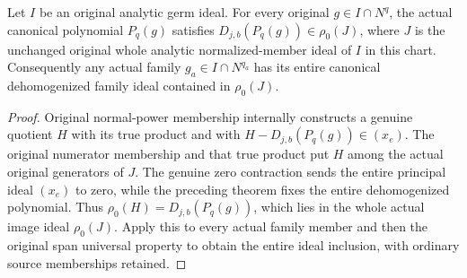 \begin{theorem}
\label{hir:actual-normal-components-in-axis-normalized-image}
Let $I$ be an original analytic germ ideal. For every original
$g\in I\cap N^q$, the actual canonical polynomial $P_q(g)$ satisfies
$D_{j,b}(P_q(g))\in\rho_0(J)$, where $J$ is the unchanged original
whole analytic normalized-member ideal of $I$ in this chart.
Consequently any actual family $g_a\in I\cap N^{q_a}$ has its
entire canonical dehomogenized family ideal contained in $\rho_0(J)$.
\leanok
\end{theorem}
\begin{proof}
Original normal-power membership internally constructs a genuine
quotient $H$ with its true product and with
$H-D_{j,b}(P_q(g))\in(x_e)$. The original numerator membership and
that true product put $H$ among the actual original generators of $J$.
The genuine zero contraction sends the entire principal ideal $(x_e)$
to zero, while the preceding theorem fixes the entire dehomogenized
polynomial. Thus $\rho_0(H)=D_{j,b}(P_q(g))$, which lies in the whole
actual image ideal $\rho_0(J)$. Apply this to every actual family
member and then the original span universal property to obtain the
entire ideal inclusion, with ordinary source memberships retained.
\end{proof}

